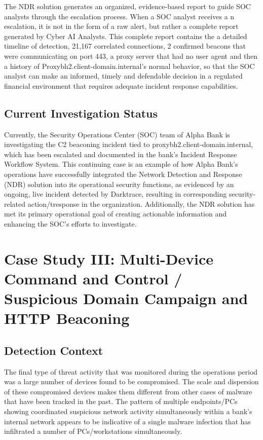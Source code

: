 \documentclass[12pt,a4paper]{report}
\begin{document}
The NDR solution generates an organized, evidence-based report to guide SOC analysts through the escalation process. When a SOC analyst receives a n escalation, it is not in the form of a raw alert, but rather a complete report generated by Cyber AI Analysts. This complete report contains the a detailed timeline of detection, 21,167 correlated connections, 2 confirmed beacons that were communicating on port 443, a proxy server that had no user agent and then a history of Proxybh2.client-domain.internal's normal behavior, so that the SOC analyst can make an informed, timely and defendable decision in a regulated financial environment that requires adequate incident response capabilities.


\subsection{Current Investigation Status}
Currently, the Security Operations Center (SOC) team of Alpha Bank is investigating the C2 beaconing incident tied to proxybh2.client-domain.internal, which has been escalated and documented in the bank's Incident Response Workflow System. This continuing case is an example of how Alpha Bank's operations have successfully integrated the Network Detection and Response (NDR) solution into its operational security functions, as evidenced by an ongoing, live incident detected by Darktrace, resulting in corresponding security-related action/tresponse in the organization. Additionally, the NDR solution has met its primary operational goal of creating actionable information and enhancing the SOC's efforts to investigate.

\section{Case Study III: Multi-Device Command and Control / Suspicious Domain Campaign and HTTP Beaconing}
\subsection{Detection Context}
The final type of threat activity that was monitored during the operations period was a large number of devices found to be compromised. The scale and dispersion of these compromised devices makes them different from other cases of malware that have been tracked in the past. The pattern of multiple endpoints/PCs showing coordinated suspicious network activity simultaneously within a bank's internal network appears to be indicative of a single malware infection that has infiltrated a number of PCs/workstations simultaneously.\\
\end{document}
